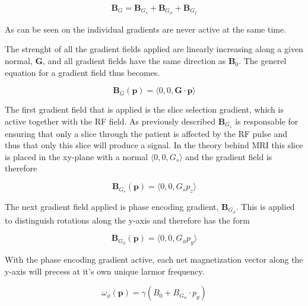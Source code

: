 \begin{displaymath}
  \mathbf{B}_G = \mathbf{B}_{G_s} + \mathbf{B}_{G_\phi} + \mathbf{B}_{G_f}
\end{displaymath}

As can be seen on  the individual
gradients are never active at the same time.

The strenght of all the gradient fields applied are linearly
increasing along a given normal, $\mathbf{G}$, and all gradient fields
have the same direction as $\mathbf{B}_0$. The generel equation for a
gradient field thus becomes.

\begin{displaymath}
  \mathbf{B}_G(\mathbf{p}) = \langle 0, 0, \mathbf{G} \cdot \mathbf{p} \rangle
\end{displaymath}


The first gradient field that is applied is the slice selection
gradient, which is active together with the RF field. As previously
described $\mathbf{B}_{G_s}$ is responsable for ensuring that only a
slice through the patient is affected by the RF pulse and thus that
only this slice will produce a signal. In the theory behind MRI this
slice is placed in the xy-plane with a normal $\langle 0, 0, G_s
\rangle$ and the gradient field is therefore

\begin{displaymath}
  \mathbf{B}_{G_s}(\mathbf{p}) = \langle 0, 0, G_s p_z \rangle
\end{displaymath}



The next gradient field applied is phase encoding gradient,
$\mathbf{B}_{G_\phi}$. This is applied to distinguish rotations along
the y-axis and therefore has the form

\begin{displaymath}
  \mathbf{B}_{G_\phi}(\mathbf{p}) = \langle 0, 0, G_\phi p_y \rangle
\end{displaymath}


With the phase encoding gradient active, each net magnetization vector
along the y-axis will precess at it's own unique larmor frequency. 

\begin{displaymath}
  \omega_\phi(\mathbf{p}) = \gamma (B_0 + B_{G_\phi} \cdot p_y)
\end{displaymath}

